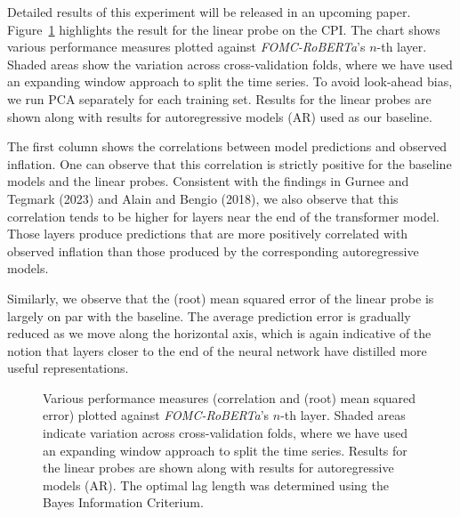 \documentclass[
  letterpaper,
  DIV=11,
  numbers=noendperiod]{scrartcl}
\theoremstyle{plain}
\theoremstyle{remark}
\begin{document}
Detailed results of this experiment will be released in an upcoming
paper. Figure~\ref{fig-fomc} highlights the result for the linear probe
on the CPI. The chart shows various performance measures plotted against
\emph{FOMC-RoBERTa}'s \(n\)-th layer. Shaded areas show the variation
across cross-validation folds, where we have used an expanding window
approach to split the time series. To avoid look-ahead bias, we run PCA
separately for each training set. Results for the linear probes are
shown along with results for autoregressive models (AR) used as our
baseline.

The first column shows the correlations between model predictions and
observed inflation. One can observe that this correlation is strictly
positive for the baseline models and the linear probes. Consistent with
the findings in Gurnee and Tegmark (2023) and Alain and Bengio (2018),
we also observe that this correlation tends to be higher for layers near
the end of the transformer model. Those layers produce predictions that
are more positively correlated with observed inflation than those
produced by the corresponding autoregressive models.

Similarly, we observe that the (root) mean squared error of the linear
probe is largely on par with the baseline. The average prediction error
is gradually reduced as we move along the horizontal axis, which is
again indicative of the notion that layers closer to the end of the
neural network have distilled more useful representations.

\begin{figure}


\caption{\label{fig-fomc}Various performance measures (correlation and
(root) mean squared error) plotted against \emph{FOMC-RoBERTa}'s
\(n\)-th layer. Shaded areas indicate variation across cross-validation
folds, where we have used an expanding window approach to split the time
series. Results for the linear probes are shown along with results for
autoregressive models (AR). The optimal lag length was determined using
the Bayes Information Criterium.}

\end{figure}%
\end{document}
